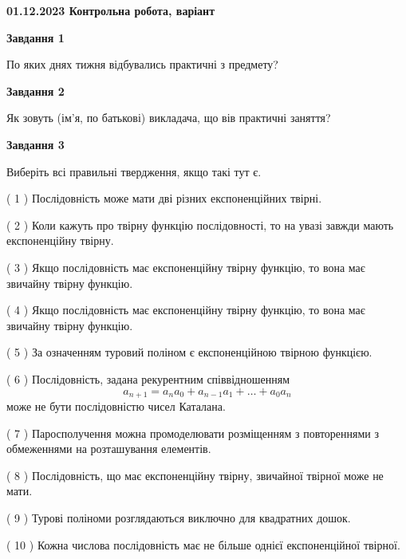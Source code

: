 \documentclass[12pt, ukrainian]{article}
\begin{document}
\begin {large}

\textbf{01.12.2023 Контрольна робота, варіант  }\par


{
{\begin {center}\textbf{Завдання 1}\end {center}}\par
По яких днях тижня відбувались практичні з предмету?\par
{\begin {center}\textbf{Завдання 2}\end {center}}\par
Як зовуть (ім'я, по батькові) викладача, що вів практичні заняття?\par
{\begin {center}\textbf{Завдання 3}\end {center}}\par
Виберіть всі правильні твердження, якщо такі тут є.\par
\vspace{2mm}
( 1 ) Послідовність може мати дві різних експоненційних твірні.%

( 2 ) Коли кажуть про твірну функцію послідовності, то на увазі завжди мають експоненційну твірну.%

( 3 ) Якщо послідовність має експоненційну твірну функцію, то вона має звичайну твірну функцію.%

( 4 ) Якщо послідовність має експоненційну твірну функцію, то вона має звичайну твірну функцію.%

( 5 ) За означенням туровий поліном є експоненційною твірною функцією.%

( 6 ) Послідовність, задана рекурентним співвідношенням $$a_{n+1}=a_{n}a_{0}+a_{n-1}a_{1}+\ldots+a_0a_{n}$$ може не бути послідовністю чисел Каталана.%

( 7 ) Паросполучення можна промоделювати розміщенням з повтореннями з обмеженнями на розташування елементів.%

( 8 ) Послідовність, що має експоненційну твірну, звичайної твірної може не мати.%

( 9 ) Турові поліноми розглядаються виключно для квадратних дошок.%

( 10 ) Кожна числова послідовність має не більше однієї  експоненційної твірної.%
}
\end {large}

\vspace{4mm}
\newpage
\end{document}
